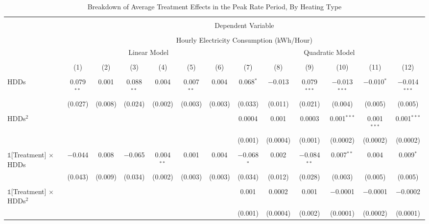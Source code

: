 
\begin{table}[!htbp] \centering 
  \caption{Breakdown of Average Treatment Effects in the Peak Rate Period, By Heating Type} 
  \label{Table:Breakdown-of-Average-Treatment-Effects-in-the-Peak-Rate-Period_By-Heating-Type_Linear-and-Quadratic-Models} 
\small 
\begin{tabular}{@{\extracolsep{20pt}}lcccccccccccc} 
\\[-1.8ex]\hline 
\hline \\[-1.8ex] 
 & \multicolumn{12}{c}{Dependent Variable} \\ 
\cline{2-13} 
\\[-1.8ex] & \multicolumn{12}{c}{Hourly Electricity Consumption  (kWh/Hour)} \\ 
 & \multicolumn{6}{c}{Linear Model} & \multicolumn{6}{c}{Quadratic Model} \\ 
\\[-1.8ex] & (1) & (2) & (3) & (4) & (5) & (6) & (7) & (8) & (9) & (10) & (11) & (12)\\ 
\hline \\[-1.8ex] 
 HDDs & 0.079$^{**}$ & 0.001 & 0.088$^{**}$ & 0.004 & 0.007$^{**}$ & 0.004 & 0.068$^{*}$ & $-$0.013 & 0.079$^{***}$ & $-$0.013$^{***}$ & $-$0.010$^{*}$ & $-$0.014$^{***}$ \\ 
  & (0.027) & (0.008) & (0.024) & (0.002) & (0.003) & (0.003) & (0.033) & (0.011) & (0.021) & (0.004) & (0.005) & (0.005) \\ 
  & & & & & & & & & & & & \\ 
 HDDs$^{2}$ &  &  &  &  &  &  & 0.0004 & 0.001 & 0.0003 & 0.001$^{***}$ & 0.001$^{***}$ & 0.001$^{***}$ \\ 
  &  &  &  &  &  &  & (0.001) & (0.0004) & (0.001) & (0.0002) & (0.0002) & (0.0002) \\ 
  & & & & & & & & & & & & \\ 
 $\mathbb{1}$[Treatment] $\times$ HDDs & $-$0.044 & 0.008 & $-$0.065 & 0.004$^{**}$ & 0.001 & 0.004 & $-$0.068$^{*}$ & 0.002 & $-$0.084$^{**}$ & 0.007$^{**}$ & 0.004 & 0.009$^{*}$ \\ 
  & (0.043) & (0.009) & (0.034) & (0.002) & (0.003) & (0.003) & (0.034) & (0.012) & (0.028) & (0.003) & (0.005) & (0.005) \\ 
  & & & & & & & & & & & & \\ 
 $\mathbb{1}$[Treatment] $\times$ HDDs$^{2}$ &  &  &  &  &  &  & 0.001 & 0.0002 & 0.001 & $-$0.0001 & $-$0.0001 & $-$0.0002 \\ 
  &  &  &  &  &  &  & (0.001) & (0.0004) & (0.002) & (0.0001) & (0.0002) & (0.0001) \\ 

\end{tabular}
\end{table}

